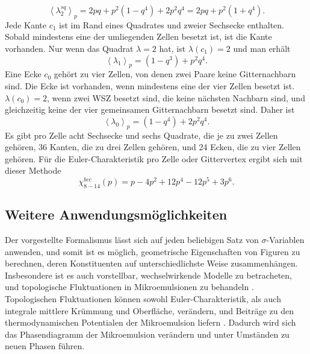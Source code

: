 \begin{equation}
 \left<\lambda_2^{sq}\right>_{p}=2pq+p^2(1-q^4)+2p^2q^4=2pq+p^2(1+q^4).
\end{equation}
Jede Kante $c_1$ ist im Rand eines Quadrates und zweier Sechsecke enthalten. Sobald mindestens eine der umliegenden Zellen besetzt ist, ist die Kante vorhanden. Nur wenn das Quadrat $\lambda=2$ hat, ist $\lambda(c_1)=2$ und man erh\"alt
\begin{equation}
 \left<\lambda_1\right>_{p}=(1-q^3)+p^2q^4. 
\end{equation}
Eine Ecke $c_0$ geh\"ort zu vier Zellen, von denen zwei Paare keine Gitternachbarn sind. Die Ecke ist vorhanden, wenn mindestens eine der vier Zellen besetzt ist. $\lambda(c_0)=2$, wenn zwei WSZ besetzt sind, die keine n\"achsten Nachbarn sind, und gleichzeitig keine der vier gemeinsamen Gitternachbarn besetzt sind. Daher ist
\begin{equation}
 \left<\lambda_0\right>_{p}=(1-q^4)+2p^2q^4. 
\end{equation}
Es gibt pro Zelle acht Sechsecke und sechs Quadrate, die je zu zwei Zellen geh\"oren, 36 Kanten, die zu drei Zellen geh\"oren, und 24 Ecken, die zu vier Zellen geh\"oren. F\"ur die Euler-Charakteristik pro Zelle oder Gittervertex ergibt sich mit dieser Methode
\begin{equation}
  \chi^{bcc}_{8-14}(p)=p-4p^2+12p^4-12p^5+3p^6.
\end{equation}

\subsection{Weitere Anwendungsm\"oglichkeiten}
Der vorgestellte Formalismus l\"asst sich auf jeden beliebigen Satz von $\sigma$-Variablen anwenden, und somit ist es m\"oglich, geometrische Eigenschaften von Figuren zu berechnen, deren Konstituenten auf unterschiedlichste Weise zusammenh\"angen. Insbesondere ist es auch vorstellbar, wechselwirkende Modelle zu betracheten, und topologische Fluktuationen in Mikroemulsionen zu behandeln \cite{Jung:00}. Topologischen Fluktuationen k\"onnen sowohl Euler-Charakteristik, als auch integrale mittlere Kr\"ummung und Oberfl\"ache, ver\"andern, und Beitr\"age zu den thermodynamischen Potentialen der Mikroemulsion liefern \cite{Likos:95}. Dadurch wird sich das Phasendiagramm der Mikroemulsion ver\"andern und unter Umst\"anden zu neuen Phasen f\"uhren.
